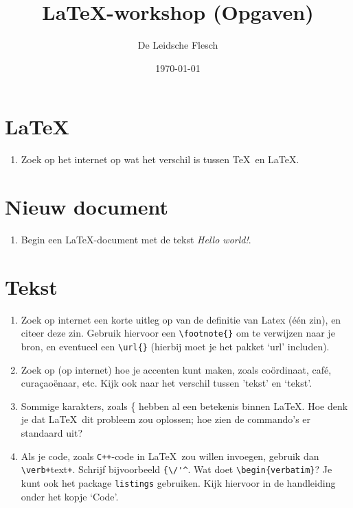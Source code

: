 \documentclass{article}
\begin{document}
\title{\LaTeX-workshop (Opgaven)}
\author{De Leidsche Flesch}
\date{\today}

\maketitle

\section{\LaTeX}
	\begin{enumerate}
		\item Zoek op het internet op wat het verschil is tussen \TeX \ en \LaTeX.
	\end{enumerate}
	
\section{Nieuw document}
	\begin{enumerate}
		\item Begin een \LaTeX-document met de tekst \emph{Hello world!}.
	\end{enumerate}
	
\section{Tekst}
	\begin{enumerate}
		\item Zoek op internet een korte uitleg op van de definitie van Latex (\'e\'en zin), en citeer deze zin. Gebruik hiervoor een \verb+\footnote{}+ om te verwijzen naar je bron, en eventueel een \verb+\url{}+ (hierbij moet je het pakket `url' includen).
		\item Zoek op (op internet) hoe je accenten kunt maken, zoals co\"ordinaat, caf\'e, cura\c{c}ao\"enaar, etc. Kijk ook naar het verschil tussen 'tekst' en `tekst'.
		\item Sommige karakters, zoals \{ hebben al een betekenis binnen \LaTeX. Hoe denk je dat \LaTeX\ dit probleem zou oplossen; hoe zien de commando's er standaard uit?
		\item Als je code, zoals \verb.C++.-code in \LaTeX \ zou willen invoegen, gebruik dan \verb.\verb+.text\verb.+.. Schrijf bijvoorbeeld \verb.{\/'^.. Wat doet \verb.\begin{verbatim}.? Je kunt ook het package \texttt{listings} gebruiken. Kijk hiervoor in de handleiding onder het kopje `Code'.
	\end{enumerate}
\end{document}

